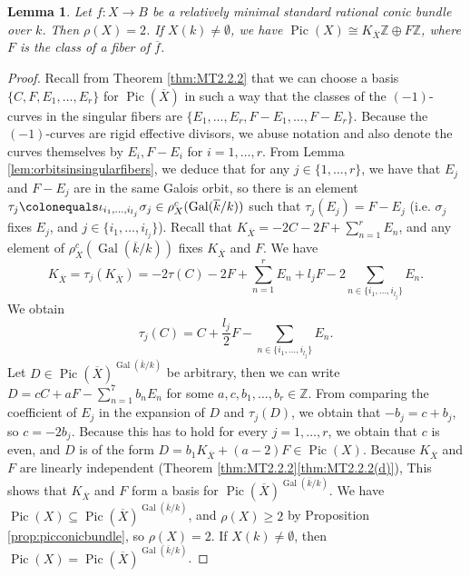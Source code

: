 \documentclass[a4paper, 11pt, reqno]{amsart}
\numberwithin{equation}{section} \numberwithin{figure}{section}
\DeclareMathOperator{\Pic}{Pic}
\DeclareMathOperator{\Gal}{Gal}
\def \Z {{\mathbb Z}}
\newcommand{\ra}{\rightarrow}
\newtheorem{lemma}{Lemma}
\theoremstyle{definition}
\numberwithin{lemma}{section}
\begin{document}
\begin{lemma}\label{lem:relativelyminalrank2}
     Let $f \colon X \ra B$ be a relatively minimal standard rational conic bundle over $k$. Then $\rho(X) = 2$. If $X(k) \neq \emptyset$, we have $\Pic(X) \cong K_{\overline{X}} \Z \oplus F \Z$, where $F$ is the class of a fiber of $\overline{f}$.
\end{lemma}

\begin{proof}   
    Recall from Theorem \ref{thm:MT2.2.2} that we can choose a basis $\{C, F, E_1, \ldots, E_r\}$ for $\Pic(\overline{X})$ in such a way that the classes of the $(-1)$-curves in the singular fibers are $\{E_1, \ldots, E_r, F-E_1, \ldots, F - E_r\}$. Because the $(-1)$-curves are rigid effective divisors, we abuse notation and also denote the curves themselves by $E_i, F-E_i$ for $i = 1, \ldots, r$. From Lemma \ref{lem:orbitsinsingularfibers}, we deduce that for any $j \in \{1, \ldots, r\}$, we have that $E_j$ and $F - E_j$ are in the same Galois orbit, so there is an element $\tau_j \colonequals \iota_{i_1, \ldots, i_{l_j}}\sigma_j \in \rho_X^c(\Gal(\overline{k}/k))$ such that $\tau_j(E_j) = F - E_j$ (i.e. $\sigma_j$ fixes $E_j$, and $j \in \{i_1, \ldots, i_{l_j}\}$). Recall that $K_{\overline{X}} = -2C -2F + \sum_{n=1}^r E_n$, and any element of $\rho_X^c(\Gal(\overline{k}/k))$ fixes $K_{\overline{X}}$ and $F$. We have
    \[K_{\overline{X}} = \tau_j(K_{\overline{X}}) = -2 \tau(C) -2F + \sum_{n=1}^r E_n + l_j F -2 \sum_{n \in \{i_1, \ldots, i_{l_j}\}} E_n.\] We obtain \[\tau_j(C) = C  + \frac{l_j}{2}F - \sum_{n \in \{i_1, \ldots, i_{l_j}\}} E_n.\]
    Let $D \in \Pic(\overline{X})^{\Gal(\overline{k}/k)}$ be arbitrary, then we can write $D = cC + aF - \sum_{n=1}^7 b_n E_n$ for some $a, c, b_1, \ldots, b_r \in \Z$. From comparing the coefficient of $E_j$ in the expansion of $D$ and $\tau_j(D)$, we obtain that $-b_j = c + b_j$, so $c = -2b_j$. Because this has to hold for every $j = 1, \ldots, r$, we obtain that $c$ is even, and $D$ is of the form $D = b_1 K_{\overline{X}} + (a - 2)F \in \Pic(X)$. Because $K_{\overline{X}}$ and $F$ are linearly independent (Theorem \ref{thm:MT2.2.2}\ref{thm:MT2.2.2(d)}), This shows that $K_{\overline{X}}$ and $F$ form a basis for $\Pic(\overline{X})^{\Gal(\overline{k}/k)}$. We have $\Pic(X) \subseteq \Pic(\overline{X})^{\Gal(\overline{k}/k)}$, and $\rho(X) \geq 2$ by Proposition \ref{prop:picconicbundle}, so $\rho(X) = 2$. If $X(k) \neq \emptyset$, then $\Pic(X) = \Pic(\overline{X})^{\Gal(\overline{k}/k)}$.
\end{proof}
\end{document}
